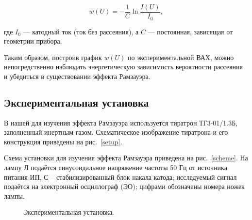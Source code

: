 \documentclass[a4paper,12pt]{article} %
\begin{document}
\begin{equation}
w(U) = -\frac{1}{C} \ln \frac{I(U)}{I_0},
\end{equation}

где $I_0$ — катодный ток (ток без рассеяния), а $C$ — постоянная, зависящая от геометрии прибора.

Таким образом, построив график $w(U)$ по экспериментальной ВАХ, можно непосредственно наблюдать энергетическую зависимость вероятности рассеяния и убедиться в существовании эффекта Рамзауэра.


\begin{center}
\section*{Экспериментальная установка}
\end{center}
    
В нашей для изучения эффекта Рамзауэра используется тиратрон ТГ3-01/1.3Б, заполненный инертным газом. Схематическое изображение тиратрона и его конструкция приведены на рис.~\ref{setup}.

Схема установки для изучения эффекта Рамзауэра приведена на рис.~\ref{scheme}. На лампу Л подаётся синусоидальное напряжение частоты 50 Гц от источника питания ИП, С -- стабилизированный блок накала катода; исследуемый сигнал подаётся на электронный осциллограф (ЭО); цифрами обозначены номера ножек лампы.

\begin{figure}[h!]
    {\caption{Экспериментальная установка.}}
\end{figure}
\end{document}
